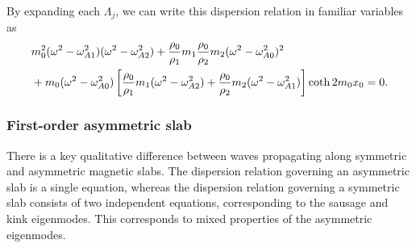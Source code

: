 By expanding each $\Lambda_j$, we can write this dispersion relation in familiar variables as
\begin{align}
&m_0^2(\omega^2 - \omega_{A1}^2)(\omega^2 - \omega_{A2}^2) + \frac{\rho_0}{\rho_1}m_1\frac{\rho_0}{\rho_2}m_2(\omega^2 - \omega_{A0}^2)^2 \notag \\
& + m_0(\omega^2 - \omega_{A0}^2)\left[\frac{\rho_0}{\rho_1}m_1(\omega^2 - \omega_{A2}^2) + \frac{\rho_0}{\rho_2}m_2(\omega^2 - \omega_{A1}^2)\right]\coth{2m_0x_0} = 0. \label{DR}
\end{align}


\subsubsection{First-order asymmetric slab} \label{sec: first order slab}

There is a key qualitative difference between waves propagating along symmetric and asymmetric magnetic slabs. The dispersion relation governing an asymmetric slab is a single equation, whereas the dispersion relation governing a symmetric slab \citep{rob81a} consists of two independent equations, corresponding to the sausage and kink eigenmodes. This corresponds to mixed properties of the asymmetric eigenmodes.

